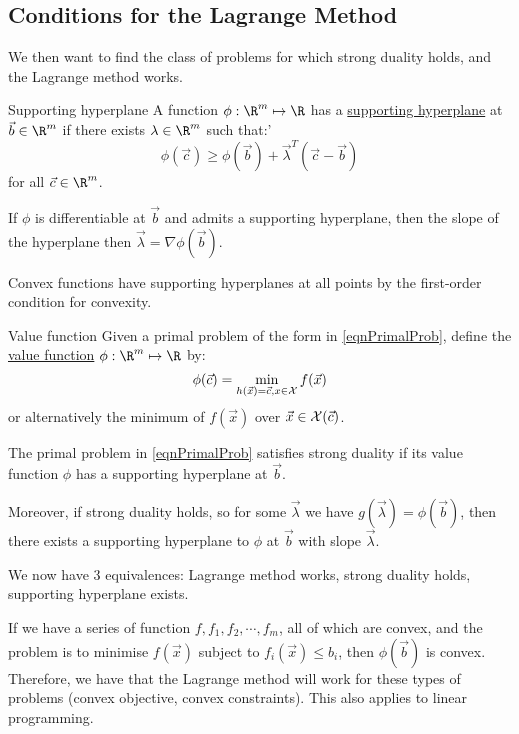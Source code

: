 \documentclass[../Main.tex]{subfiles}
\begin{document}
\subsection{Conditions for the Lagrange Method}
We then want to find the class of problems for which strong duality holds, and the Lagrange method works.
\begin{definition}{Supporting hyperplane}
    A function $\phi : \R^m \mapsto \R$ has a \underline{supporting hyperplane} at $\vec{b} \in \R^m$ if there exists $\lambda \in \R^m$ such that:'
    \begin{equation}
        \phi(\vec{c}) \geq \phi(\vec{b}) + \vec{\lambda}^T (\vec{c} - \vec{b})
        \label{eqnSupportHyperPln}
    \end{equation}
    for all $\vec{c} \in \R^m$.
\end{definition}
\begin{remarks}
    \item If $\phi$ is differentiable at $\vec{b}$ and admits a supporting hyperplane, then the slope of the hyperplane then $\vec{\lambda} = \nabla \phi(\vec{b})$.
    \item Convex functions have supporting hyperplanes at all points by the first-order condition for convexity.
\end{remarks}
\begin{definition}{Value function}
    Given a primal problem of the form in \ref{eqnPrimalProb}, define the \underline{value function} $\phi : \R^m \mapsto \R$ by:
    \begin{equation*}
        \phi(\vec{c}) = \min_{h(\vec{x}) = \vec{c}, x \in \mathcal{X}} f(\vec{x})
    \end{equation*}
    or alternatively the minimum of $f(\vec{x})$ over $\vec{x} \in \mathcal{X}(\vec{c})$.
\end{definition}
\begin{theorem}
    The primal problem in \ref{eqnPrimalProb} satisfies strong duality if its value function $\phi$ has a supporting hyperplane at $\vec{b}$.

    Moreover, if strong duality holds, so for some $\vec{\lambda}$ we have $g(\vec{\lambda}) = \phi(\vec{b})$, then there exists a supporting hyperplane to $\phi$ at $\vec{b}$ with slope $\vec{\lambda}$.
\end{theorem}
\begin{remarks}
    \item We now have 3 equivalences: Lagrange method works, strong duality holds, supporting hyperplane exists.
    \item If we have a series of function $f, f_1, f_2, \cdots, f_m$, all of which are convex, and the problem is to minimise $f(\vec{x})$ subject to $f_i(\vec{x}) \leq b_i$, then $\phi(\vec{b})$ is convex. Therefore, we have that the Lagrange method will work for these types of problems (convex objective, convex constraints). This also applies to linear programming.
\end{remarks}
\end{document}

